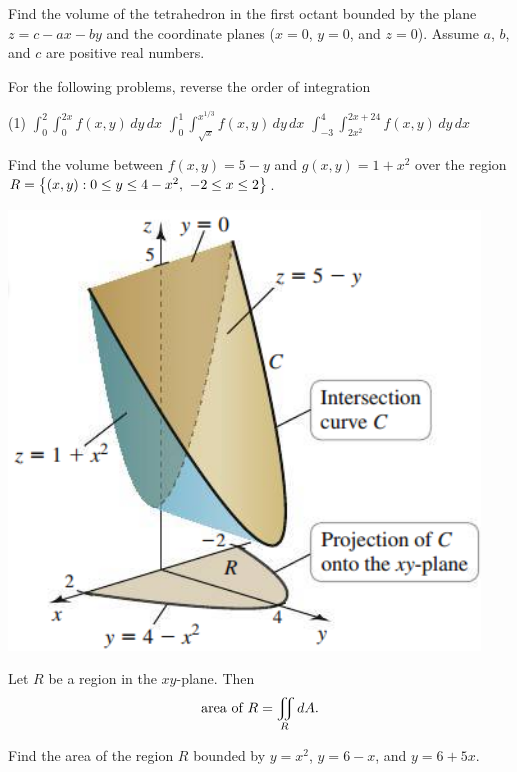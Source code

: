 \documentclass[mathNotesPreamble]{subfiles}
\begin{document}
  \begin{ex*}
    Find the volume of the tetrahedron in the first octant bounded by the plane $z=c-ax-by$ and the coordinate planes ($x=0$, $y=0$, and $z=0$). Assume $a$, $b$, and $c$ are positive real numbers.
  \end{ex*}
  \pagebreak

  \begin{ex*}
    For the following problems, reverse the order of integration
  \end{ex*}
  \begin{tasks}[after-item-skip=\stretch{1}, label=\textbullet](1)
    \task 
      $\displaystyle \int_{0}^{2} \int_{0}^{2x} f(x,y)\,dy\,dx$
    \task 
      $\displaystyle \int_{0}^{1} \int_{\sqrt{x}}^{x^{1/3}} f(x,y)\,dy\,dx$
    \task 
      $\displaystyle \int_{-3}^{4} \int_{2x^2}^{2x+24} f(x,y)\,dy\,dx$
  \end{tasks}
  \pagebreak

  \begin{ex*}
    Find the volume between $f(x,y)=5-y$ and $g(x,y)=1+x^2$ over the region $R={\left\{(x,y): 0\leq y\leq 4-x^2,\ -2\leq x\leq 2\right\}}$.
  \end{ex*}
  \begin{flushright}
    \includegraphics[width=0.3\linewidth]{images/briggs_16_02/fig16_23}
  \end{flushright}
  \pagebreak

  \begin{thmBox*}
    Let $R$ be a region in the $xy$-plane. Then
      \[\textnormal{area of } R=\iint\limits_R dA.\]
  \end{thmBox*}

  \begin{ex*}
    Find the area of the region $R$ bounded by $y=x^2$, $y=6-x$, and $y=6+5x$.
  \end{ex*}

  \pagebreak
  
\end{document}
